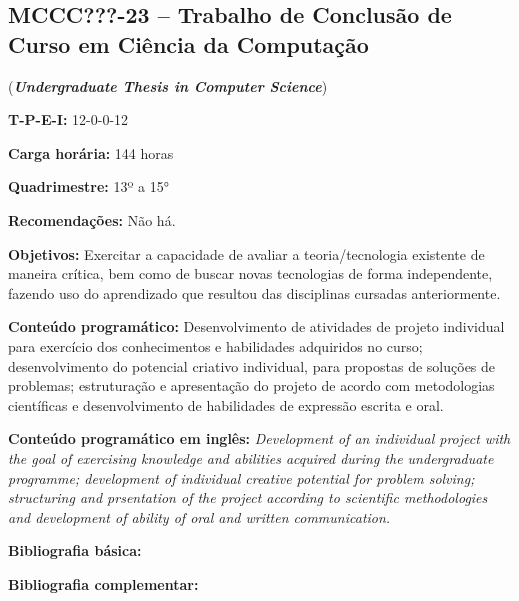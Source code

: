 \documentclass[12pt,a4paper]{article}
\begin{document}
\subsection*{MCCC???-23 -- Trabalho de Conclusão de Curso em Ciência da Computação}
\label{disc:tcc}

(\textbf{\textit{Undergraduate Thesis in Computer Science}})

\begin{center}
\begin{minipage}{0.85\textwidth}

    \textbf{T-P-E-I:} 12-0-0-12

    \textbf{Carga horária:} 144 horas
    
    \textbf{Quadrimestre:} 13º a 15°
    
    \textbf{Recomendações:} Não há.
    
\end{minipage}
\end{center}

\textbf{Objetivos:}
Exercitar a capacidade de avaliar a teoria/tecnologia existente de
maneira crítica, bem como de buscar novas tecnologias de forma
independente, fazendo uso do aprendizado que resultou das disciplinas
cursadas anteriormente.

\textbf{Conteúdo programático:}
Desenvolvimento de atividades de projeto individual para exercício dos
conhecimentos e habilidades adquiridos no curso; desenvolvimento do
potencial criativo individual, para propostas de soluções de
problemas; estruturação e apresentação do projeto de acordo com
metodologias científicas e desenvolvimento de habilidades de expressão
escrita e oral.


\textbf{Conteúdo programático em inglês:}
\textit{Development of an individual project with the goal of exercising
  knowledge and abilities acquired during the undergraduate programme;
  development of individual creative potential for problem solving;
  structuring and prsentation of the project according to scientific
  methodologies and development of ability of oral and written communication.}
  
\newrefsection
\textbf{Bibliografia básica:}
\nocite{2007-cervo-bervian, 2010-creswell-creswell, 2010-salomon} 
\printbibliography

\newrefsection
\textbf{Bibliografia complementar:}
\nocite{2015-junior, 2014-wazlawick, 2019-medeiros, 2016-wayne, 2001-rubens}

\printbibliography
\end{document}

